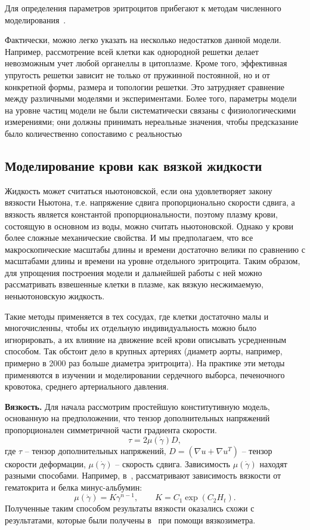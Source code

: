 Для определения параметров эритроцитов прибегают к методам численного моделирования~\cite{bessonov:2014}.

Фактически, можно легко указать на несколько недостатков данной модели. Например, рассмотрение всей клетки как однородной решетки 
делает невозможным учет любой органеллы в цитоплазме. Кроме того, эффективная упругость решетки зависит не только от 
пружинной постоянной, но и от конкретной формы, размера и топологии решетки. Это затрудняет сравнение между различными моделями 
и экспериментами. Более того, параметры модели на уровне частиц  модели не были систематически связаны с физиологическими измерениями; 
они должны принимать нереальные значения, чтобы предсказание было количественно сопоставимо с реальностью 


\subsection{Моделирование крови как вязкой жидкости}
Жидкость может считаться ньютоновской, если она удовлетворяет закону вязкости Ньютона, 
т.е. напряжение сдвига пропорционально скорости сдвига, а вязкость является константой пропорциональности, 
поэтому плазму крови, состоящую в основном из воды, можно считать ньютоновской. Однако у крови более сложные механические свойства. 
И мы предполагаем, что все макроскопические масштабы длины и времени достаточно велики по сравнению с масштабами длины и времени 
на уровне отдельного эритроцита. Таким образом, для упрощения построения модели и дальнейшей работы с ней можно рассматривать 
взвешенные клетки в плазме, как вязкую несжимаемую, неньютоновскую жидкость.

Такие методы применяется в тех сосудах, где клетки достаточно малы и многочисленны, чтобы их отдельную индивидуальность можно было
игнорировать, а их влияние на движение всей крови описывать усредненным способом. 
Так обстоит дело в крупных артериях (диаметр аорты, например, примерно в 2000 раз больше диаметра эритроцита). 
На практике эти методы применяются в изучении и моделировании сердечного выборса, печеночного кровотока, среднего артериального давления.

\textbf{Вязкость.}
Для начала рассмотрим простейшую конститутивную модель, основанную на предположении, что тензор дополнительных напряжений пропорционален
симметричной части градиента скорости.
$$
\tau=2\mu (\dot{\gamma})D,
$$
где $\tau $ -- тензор дополнительных напряжений, $D=(\nabla u+\nabla u^T)$ -- тензор скорости деформации, 
$\mu (\dot{\gamma})$ -- скорость сдвига.
Зависимость $\mu (\dot{\gamma})$ находят разными способами. Например, в~\cite{walburn:1976}, 
рассматривают зависимость вязкости от гематокрита и белка минус-альбумин: \\
$$
\mu (\dot{\gamma})=K{\gamma}^{n-1}, \qquad  K=C_1 \exp (C_2 H_t).
$$
Полученные таким способом результаты вязкости оказались схожи с результатами, которые были получены в~\cite{kim:2000} при помощи вязкозиметра.\\

